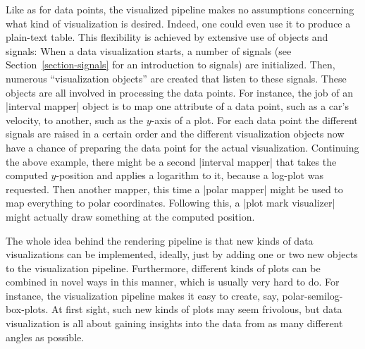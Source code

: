 Like as for data points, the visualized pipeline makes no assumptions
concerning what kind of visualization is desired. Indeed, one could even use it
to produce a plain-text table. This flexibility is achieved by extensive use of
objects and signals: When a data visualization starts, a number of signals (see
Section~\ref{section-signals} for an introduction to signals) are initialized.
Then, numerous ``visualization objects'' are created that listen to these
signals. These objects are all involved in processing the data points. For
instance, the job of an |interval mapper| object is to map one attribute of a
data point, such as a car's velocity, to another, such as the $y$-axis of a
plot. For each data point the different signals are raised in a certain order
and the different visualization objects now have a chance of preparing the data
point for the actual visualization. Continuing the above example, there might
be a second |interval mapper| that takes the computed $y$-position and applies
a logarithm to it, because a log-plot was requested. Then another mapper, this
time a |polar mapper| might be used to map everything to polar coordinates.
Following this, a |plot mark visualizer| might actually draw something at the
computed position.

The whole idea behind the rendering pipeline is that new kinds of data
visualizations can be implemented, ideally, just by adding one or two new
objects to the visualization pipeline. Furthermore, different kinds of plots
can be combined in novel ways in this manner, which is usually very hard to do.
For instance, the visualization pipeline makes it easy to create, say,
polar-semilog-box-plots. At first sight, such new kinds of plots may seem
frivolous, but data visualization is all about gaining insights into the data
from as many different angles as possible.

